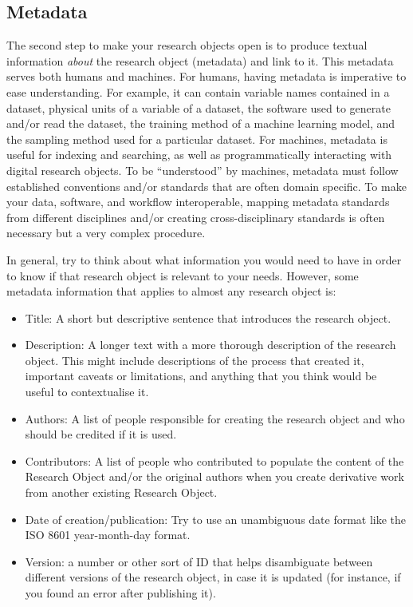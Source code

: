 \documentclass[
  letterpaper,
  DIV=11,
  numbers=noendperiod]{scrreport}
\providecommand{\tightlist}{%
  \setlength{\itemsep}{0pt}\setlength{\parskip}{0pt}}\usepackage{longtable,booktabs,array}
\begin{document}
\hypertarget{metadata-1}{%
\subsection{Metadata}\label{metadata-1}}

The second step to make your research objects open is to produce textual
information \emph{about} the research object (metadata) and link to it.
This metadata serves both humans and machines. For humans, having
metadata is imperative to ease understanding. For example, it can
contain variable names contained in a dataset, physical units of a
variable of a dataset, the software used to generate and/or read the
dataset, the training method of a machine learning model, and the
sampling method used for a particular dataset. For machines, metadata is
useful for indexing and searching, as well as programmatically
interacting with digital research objects. To be ``understood'' by
machines, metadata must follow established conventions and/or standards
that are often domain specific. To make your data, software, and
workflow interoperable, mapping metadata standards from different
disciplines and/or creating cross-disciplinary standards is often
necessary but a very complex procedure.

In general, try to think about what information you would need to have
in order to know if that research object is relevant to your needs.
However, some metadata information that applies to almost any research
object is:

\begin{itemize}
\tightlist
\item
  Title: A short but descriptive sentence that introduces the research
  object.
\item
  Description: A longer text with a more thorough description of the
  research object. This might include descriptions of the process that
  created it, important caveats or limitations, and anything that you
  think would be useful to contextualise it.
\item
  Authors: A list of people responsible for creating the research object
  and who should be credited if it is used.
\item
  Contributors: A list of people who contributed to populate the content
  of the Research Object and/or the original authors when you create
  derivative work from another existing Research Object.
\item
  Date of creation/publication: Try to use an unambiguous date format
  like the ISO 8601 year-month-day format.
\item
  Version: a number or other sort of ID that helps disambiguate between
  different versions of the research object, in case it is updated (for
  instance, if you found an error after publishing it).
\end{itemize}
\end{document}
